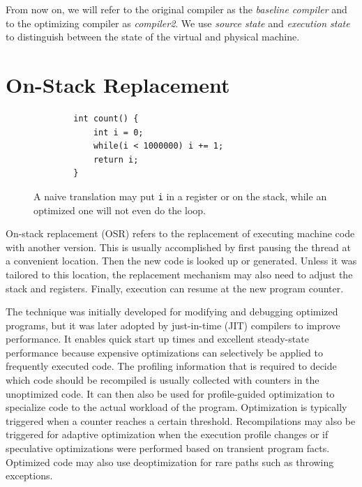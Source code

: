 \documentclass[draft,final]{vutinfth} %
\begin{document}
    From now on, we will refer to the original compiler as the \emph{baseline compiler} and
    to the optimizing compiler as \emph{compiler2}.
    We use \emph{source state} and \emph{execution state} to distinguish between
    the state of the virtual and physical machine.


    \section{On-Stack Replacement}

    \begin{figure}[h]
        \begin{lstlisting}
        int count() {
            int i = 0;
            while(i < 1000000) i += 1;
            return i;
        }
        \end{lstlisting}
        \caption{A naive translation may put \lstinline{i} in a register or on the stack, while an optimized one will not even do the loop.}
    \end{figure}

    On-stack replacement (OSR) refers to the replacement of executing machine code with another version.
    This is usually accomplished by first pausing the thread at a convenient location.
    Then the new code is looked up or generated.
    Unless it was tailored to this location, the replacement mechanism may also need to adjust the stack and registers.
    Finally, execution can resume at the new program counter.

    The technique was initially developed for modifying and debugging optimized programs\cite{10.1145/191081.191116},
    but it was later adopted by just-in-time (JIT) compilers to improve performance.
    It enables quick start up times and excellent steady-state performance
    because expensive optimizations can selectively be applied to frequently executed code.
    The profiling information that is required to decide which code should be recompiled
    is usually collected with counters in the unoptimized code.
    It can then also be used for profile-guided optimization to specialize code to the actual workload of the program.
    Optimization is typically triggered when a counter reaches a certain threshold.
    Recompilations may also be triggered for adaptive optimization
    when the execution profile changes
    or if speculative optimizations were performed based on transient program facts.
    Optimized code may also use deoptimization for rare paths such as throwing exceptions.
\end{document}
